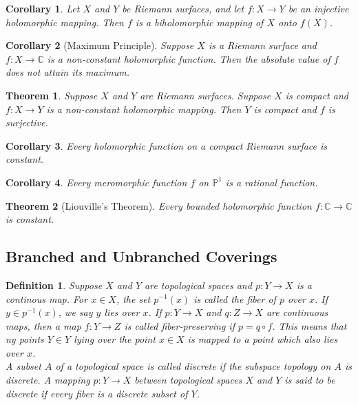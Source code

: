 \documentclass{article}
\newtheorem{thm}{Theorem}
\newtheorem{defn}{Definition}
\newtheorem{cor}{Corollary}
\begin{document}
\begin{cor}

Let $X$ and $Y$ be Riemann surfaces, and let $f: X \to Y$ be an injective holomorphic mapping. Then $f$ is a biholomorphic mapping of $X$ onto $f(X)$.

\end{cor}

\begin{cor}[Maximum Principle]
Suppose $X$ is a Riemann surface and $f:X \to \mathbb{C}$ is a non-constant holomorphic function. Then the absolute value of $f$ does not attain its maximum.
\end{cor}

\begin{thm}

Suppose $X$ and $Y$ are Riemann surfaces. Suppose $X$ is compact and $f:X \to Y$ is a non-constant holomorphic mapping. Then $Y$ is compact and $f$ is surjective.
 
\end{thm}

\begin{cor}

Every holomorphic function on a compact Riemann surface is constant.

\end{cor}

\begin{cor}

Every meromorphic function $f$ on $\mathbb{P}^1$ is a rational function.

\end{cor}

\begin{thm}[Liouville's Theorem]

Every bounded holomorphic function $f: \mathbb{C} \to \mathbb{C}$ is constant.

\end{thm}

\subsection{Branched and Unbranched Coverings}

\begin{defn}

Suppose $X$ and $Y$ are topological spaces and $p:Y \to X$ is a continous map. For $x \in X$, the set $p^{-1}(x)$ is called the \textit{fiber} of $p$ over $x$. If $y \in p^{-1}(x)$, we say $y$ \textit{lies over} $x$. If $p: Y \to X$ and $q:Z \to X$ are continuous maps, then a map $f:Y \to Z$ is called \textit{fiber-preserving} if $p=q \circ f$. This means that ny points $Y \in Y$ lying over the point $x \in X$ is mapped to a point which also lies over $x$. 
\smallskip \\
\indent A subset $A$ of a topological space is called discrete if the subspace topology on $A$ is discrete. A mapping $p:Y \to X$ between topological spaces $X$ and $Y$ is said to be discrete if every fiber is a discrete subset of $Y$.
\end{defn}
\end{document}
